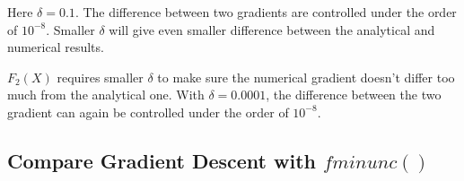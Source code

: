 Here $\delta = 0.1$. The difference between two gradients are controlled under the order of $10^{-8}$. Smaller $\delta$ will give even smaller difference between the analytical and numerical results.

$F_2(X)$ requires smaller $\delta$ to make sure the numerical gradient doesn't differ too much from the analytical one. With $\delta = 0.0001$, the difference between the two gradient can again be controlled under the order of $10^{-8}$.



\subsection{Compare Gradient Descent with $fminunc()$}




























